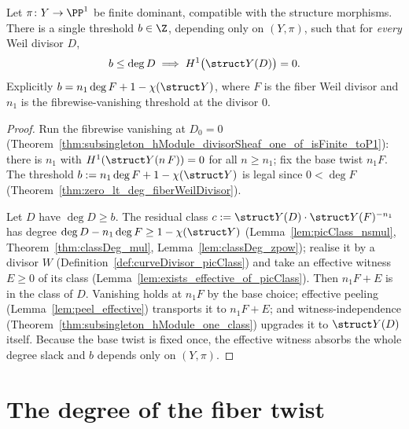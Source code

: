 \begin{theorem}
  \label{thm:exists_bound_subsingleton_hModule_one}
  \leanok
  Let \(\pi \colon Y \to \PP^1\) be finite dominant, compatible with the structure
  morphisms. There is a single threshold \(b \in \Z\), depending only on \((Y, \pi)\), such
  that for \emph{every} Weil divisor \(D\),
  \[
    b \le \deg D \implies H^1\bigl(\struct Y(D)\bigr) = 0 .
  \]
  Explicitly \(b = n_1 \deg F + 1 - \chi(\struct Y)\), where \(F\) is the fiber Weil
  divisor and \(n_1\) is the fibrewise-vanishing threshold at the divisor \(0\).
\end{theorem}
\begin{proof}
  \leanok
  Run the fibrewise vanishing at \(D_0 = 0\)
  (Theorem~\ref{thm:subsingleton_hModule_divisorSheaf_one_of_isFinite_toP1}): there is
  \(n_1\) with \(H^1(\struct Y(n\,F)) = 0\) for all \(n \ge n_1\); fix the base twist
  \(n_1 F\). The threshold \(b := n_1 \deg F + 1 - \chi(\struct Y)\) is legal since
  \(0 < \deg F\) (Theorem~\ref{thm:zero_lt_deg_fiberWeilDivisor}).

  Let \(D\) have \(\deg D \ge b\). The residual class
  \(c := \struct Y(D) \cdot \struct Y(F)^{-n_1}\) has degree
  \(\deg D - n_1\deg F \ge 1 - \chi(\struct Y)\) (Lemma~\ref{lem:picClass_nsmul},
  Theorem~\ref{thm:classDeg_mul}, Lemma~\ref{lem:classDeg_zpow}); realise it by a divisor
  \(W\) (Definition~\ref{def:curveDivisor_picClass}) and take an effective witness
  \(E \ge 0\) of its class (Lemma~\ref{lem:exists_effective_of_picClass}). Then
  \(n_1 F + E\) is in the class of \(D\). Vanishing holds at \(n_1 F\) by the base choice;
  effective peeling (Lemma~\ref{lem:peel_effective}) transports it to \(n_1 F + E\); and
  witness-independence (Theorem~\ref{thm:subsingleton_hModule_one_class}) upgrades it to
  \(\struct Y(D)\) itself. Because the base twist is fixed once, the effective witness
  absorbs the whole degree slack and \(b\) depends only on \((Y, \pi)\).
\end{proof}

\section{The degree of the fiber twist}
\label{sec:thetaDegree}

